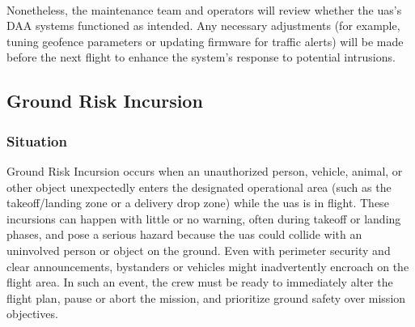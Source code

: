                 \paragraph{} Nonetheless, the maintenance team and operators will review whether the \ac{uas}'s DAA systems functioned as intended. Any necessary adjustments (for example, tuning geofence parameters or updating firmware for traffic alerts) will be made before the next flight to enhance the system’s response to potential intrusions.
        
        \subsection{Ground Risk Incursion}\label{ssec:ep-groundrisk}
        
            \subsubsection{Situation}Ground Risk Incursion occurs when an unauthorized person, vehicle, animal, or other object unexpectedly enters the designated operational area (such as the takeoff/landing zone or a delivery drop zone) while the \ac{uas} is in flight. These incursions can happen with little or no warning, often during takeoff or landing phases, and pose a serious hazard because the \ac{uas} could collide with an uninvolved person or object on the ground. Even with perimeter security and clear announcements, bystanders or vehicles might inadvertently encroach on the flight area. In such an event, the crew must be ready to immediately alter the flight plan, pause or abort the mission, and prioritize ground safety over mission objectives.
            

